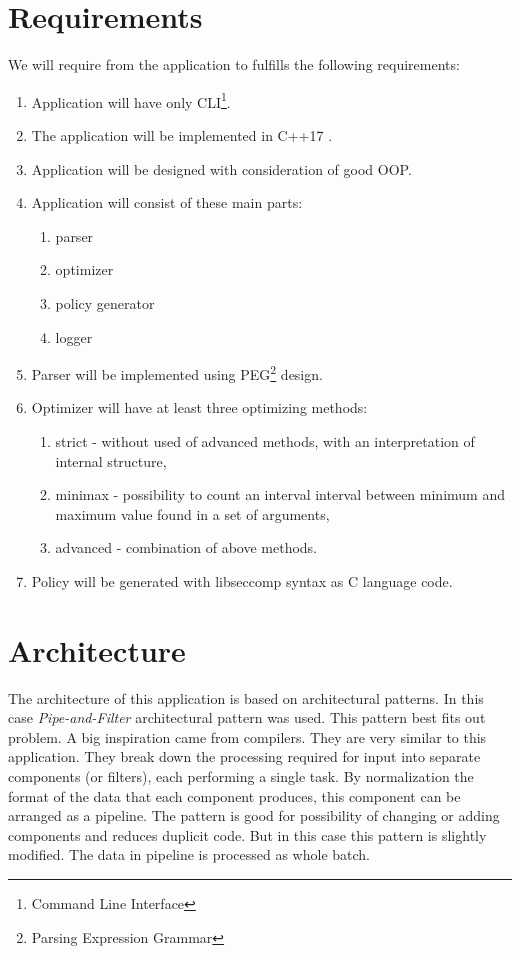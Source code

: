 \section{Requirements}
\label{sec:requirements}
We will require from the application to fulfills the following requirements:
\begin{enumerate}
\item Application will have only CLI\footnote{Command Line Interface}.
\item The application will be implemented in C++17 \cite{ISO14882}.
\item Application will be designed with consideration of good OOP.
\item Application will consist of these main parts:
	\begin{enumerate}
    \item parser
    \item optimizer
    \item policy generator
    \item logger
	\end{enumerate}
\item Parser will be implemented using PEG\footnote{Parsing Expression Grammar} \cite{PEG_def} design.
\item Optimizer will have at least three optimizing methods:
	\begin{enumerate}
    \item strict - without used of advanced methods, with an interpretation of internal structure,
    \item minimax - possibility to  count an interval interval between minimum and maximum value found in a set of arguments,
    \item advanced - combination of above methods.
	\end{enumerate}
\item Policy will be generated with libseccomp \cite{libseccomp_git} syntax as C language \cite{ISO9899} code.
\end{enumerate}

\section{Architecture}
The architecture of this application is based on architectural patterns.
In this case \textit{Pipe-and-Filter} \cite{PipeAndFilter} architectural pattern was used.
This pattern best fits out problem.
A big inspiration came from compilers.
They are very similar to this application.
They break down the processing required for input into separate components (or filters), each performing a single task.
By normalization the format of the data that each component produces, this component can be arranged as a pipeline.
The pattern is good for possibility of changing or adding components and reduces duplicit code.
But in this case this pattern is slightly modified.
The data in pipeline is processed as whole batch.

